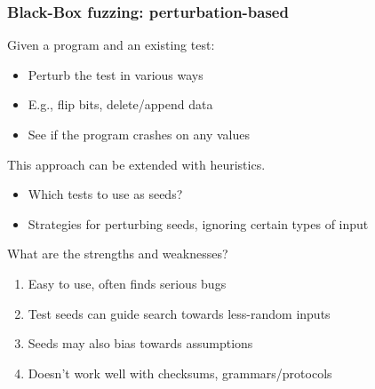 \documentclass[10pt,xcolor={dvipsnames}]{beamer}
\begin{document}

\begin{frame}

\frametitle{Black-Box fuzzing: perturbation-based}

Given a program and an existing test:
\begin{itemize}
\item Perturb the test in various ways \\[0.5em]
\item E.g., flip bits, delete/append data \\[0.5em]
\item See if the program crashes on any values \\[1.5em]
\end{itemize}

\pause
This approach can be extended with heuristics.
\begin{itemize}
\item Which tests to use as seeds? \\[0.5em]
\item Strategies for perturbing seeds, ignoring certain types of input \\[1.5em]
\end{itemize}

\pause
What are the strengths and weaknesses?
\begin{enumerate}
\pause\item Easy to use, often finds serious bugs \\[0.5em]
\pause\item Test seeds can guide search towards less-random inputs \\[0.5em]
\pause\item Seeds may also bias towards assumptions \\[0.5em]
\pause\item Doesn't work well with checksums, grammars/protocols
\end{enumerate}

\end{frame}

\end{document}
